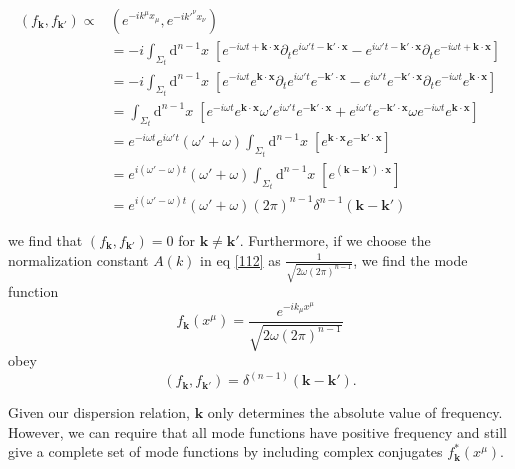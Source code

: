 \documentclass[12pt]{article}
\numberwithin{equation}{section}
\theoremstyle{1style}
\newcommand{\p}{\partial}
\newcommand{\id}{\mathrm{d}}
\begin{document}
\begin{align}
  \left(f_{\mathbf{k}},f_{\mathbf{k}'}\right)\propto
   & \left(e^{-ik^{\mu}x_{\mu}},e^{-ik'^{\nu}x_{\nu}}\right)                           \\
   & =-i\int_{\Sigma_t}\id^{n-1}x\;\left[e^{-i\omega t+\mathbf{k}\cdot\mathbf{x}}
  \p_{t}e^{i\omega' t-\mathbf{k'}\cdot\mathbf{x}}-e^{i\omega' t-\mathbf{k'}\cdot\mathbf{x}}
  \p_{t}e^{-i\omega t+\mathbf{k}\cdot\mathbf{x}}\right]                                \\
   & = -i\int_{\Sigma_t}\id^{n-1}x\;\left[e^{-i\omega t} e^{\mathbf{k}\cdot\mathbf{x}}
  \p_{t}e^{i\omega' t}e^{-\mathbf{k'}\cdot\mathbf{x}}-e^{i\omega' t}e^{-\mathbf{k'}\cdot\mathbf{x}}
  \p_{t}e^{-i\omega t}e^{\mathbf{k}\cdot\mathbf{x}}\right]                             \\
   & =\int_{\Sigma_t}\id^{n-1}x\;\left[e^{-i\omega t} e^{\mathbf{k}\cdot\mathbf{x}}
  \omega' e^{i\omega' t}e^{-\mathbf{k'}\cdot\mathbf{x}}+e^{i\omega' t}e^{-\mathbf{k'}\cdot\mathbf{x}}
  \omega e^{-i\omega t}e^{\mathbf{k}\cdot\mathbf{x}}\right]                            \\
   & =  e^{-i\omega t}e^{i\omega' t}(\omega'+\omega)\int_{\Sigma_t}\id^{n-1}x\;
  \left[ e^{\mathbf{k}\cdot\mathbf{x}}e^{-\mathbf{k'}\cdot\mathbf{x}}\right]           \\
   & =   e^{i(\omega'-\omega)t}(\omega'+\omega)\int_{\Sigma_t}\id^{n-1}x\;
  \left[ e^{(\mathbf{k}-\mathbf{k'})\cdot\mathbf{x}}\right]                            \\
   & =  e^{i(\omega'-\omega)t}(\omega'+\omega)(2\pi)^{n-1}
  \delta^{n-1}\left(\mathbf{k}-\mathbf{k'}\right)
\end{align}


we find that \(\left(f_{\mathbf{k}},f_{\mathbf{k}'}\right)=0\) for \(\mathbf{k}\neq\mathbf{k'}\).
Furthermore, if we choose the normalization constant \(A(k)\) in eq \ref{112} as
\(\frac{1}{\sqrt{2\omega(2\pi)^{n-1}}}\), we find the mode function
\begin{equation}
  f_{\mathbf{k}}(x^{\mu})=\frac{e^{-ik_{\mu}x^{\mu}}}{\sqrt{2\omega(2\pi)^{n-1}}}
\end{equation}
obey
\begin{equation}
  \left(f_{\mathbf{k}},f_{\mathbf{k}'}\right)=\delta^{(n-1)}(\mathbf{k}-\mathbf{k}').
\end{equation}

Given our dispersion relation, \(\mathbf{k}\) only determines the absolute value of frequency.
However, we can require that all mode functions have positive frequency and still give a complete set of mode functions by
including complex conjugates \(f^*_{\mathbf{k}}(x^{\mu})\).
\end{document}
